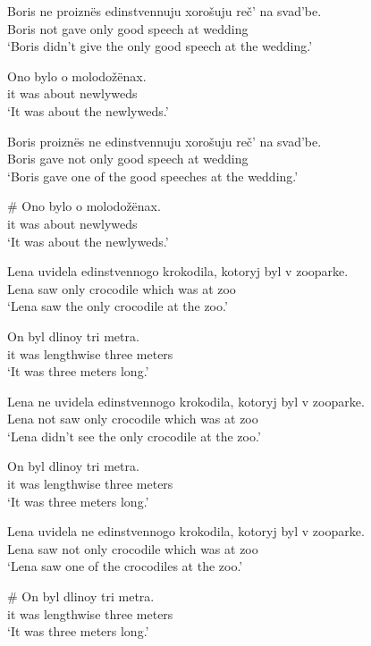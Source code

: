 \documentclass{article}
\begin{document}
\begin{exe}
	\ex \begin{xlist}
		\ex \gll Boris ne proizn\"{e}s edinstvennuju xoro\v{s}uju re\v{c}' na svad'be.\\
		Boris not gave only good speech at wedding\\
		\glt `Boris didn't give the only good speech at the wedding.'
		
		\ex \gll Ono bylo o molodo\v{z}\"{e}nax.\\
		it was about newlyweds\\
		\glt `It was about the newlyweds.'
	\end{xlist}
	
	\ex \begin{xlist}
		\ex \gll Boris proizn\"{e}s ne edinstvennuju xoro\v{s}uju re\v{c}' na svad'be.\\
		Boris gave not only good speech at wedding\\
		\glt `Boris gave one of the good speeches at the wedding.'
		
		\ex \gll \# Ono bylo o molodo\v{z}\"{e}nax.\\
		{} it was about newlyweds\\
		\glt `It was about the newlyweds.'
	\end{xlist}

	\ex \begin{xlist}
		\ex \gll Lena uvidela edinstvennogo krokodila, kotoryj byl v zooparke.\\
		Lena saw only crocodile which was at zoo\\
		\glt `Lena saw the only crocodile at the zoo.'
		
		\ex \gll On byl dlinoy tri metra.\\
		it was lengthwise three meters\\
		\glt `It was three meters long.'
	\end{xlist}

	\ex \begin{xlist}
		\ex \gll Lena ne uvidela edinstvennogo krokodila, kotoryj byl v zooparke.\\
		Lena not saw only crocodile which was at zoo\\
		\glt `Lena didn't see the only crocodile at the zoo.'
		
		\ex \gll On byl dlinoy tri metra.\\
		it was lengthwise three meters\\
		\glt `It was three meters long.'
	\end{xlist}
	
	\ex \begin{xlist}
		\ex \gll Lena uvidela ne edinstvennogo krokodila, kotoryj byl v zooparke.\\
		Lena saw not only crocodile which was at zoo\\
		\glt `Lena saw one of the crocodiles at the zoo.'
		
		\ex \gll \# On byl dlinoy tri metra.\\
		{} it was lengthwise three meters\\
		\glt `It was three meters long.'
	\end{xlist}
\end{exe}
\end{document}
